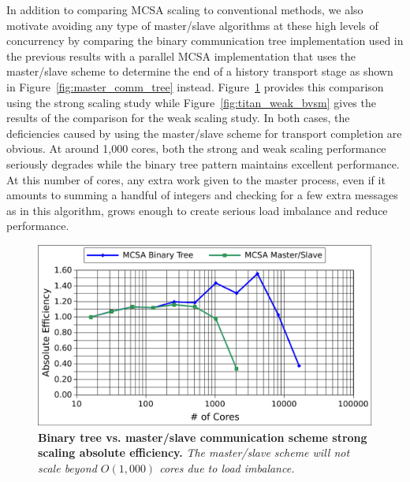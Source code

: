 In addition to comparing MCSA scaling to conventional methods, we also
motivate avoiding any type of master/slave algorithms at these high
levels of concurrency by comparing the binary communication tree
implementation used in the previous results with a parallel MCSA
implementation that uses the master/slave scheme to determine the end
of a history transport stage as shown in
Figure~\ref{fig:master_comm_tree}
instead. Figure~\ref{fig:titan_strong_bvsm} provides this comparison
using the strong scaling study while Figure~\ref{fig:titan_weak_bvsm}
gives the results of the comparison for the weak scaling study. In
both cases, the deficiencies caused by using the master/slave scheme
for transport completion are obvious. At around 1,000 cores, both the
strong and weak scaling performance seriously degrades while the
binary tree pattern maintains excellent performance. At this number of
cores, any extra work given to the master process, even if it amounts
to summing a handful of integers and checking for a few extra messages
as in this algorithm, grows enough to create serious load imbalance
and reduce performance.

\begin{figure}[t!]
  \begin{center}
    \includegraphics[width=6in]{chapters/parallel_mc/titan_strong_bvsm.pdf}
  \end{center}
  \caption{\textbf{Binary tree vs. master/slave communication scheme
      strong scaling absolute efficiency.} \textit{The master/slave
      scheme will not scale beyond $O(1,000)$ cores due to load
      imbalance.}}
  \label{fig:titan_strong_bvsm}
\end{figure}

